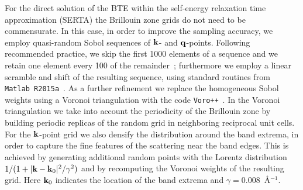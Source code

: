 \documentclass[aps,prl,twocolumn,superscriptaddress]{revtex4-1}
\begin{document}
For the direct solution of the BTE within the self-energy relaxation time approximation (SERTA)
the Brillouin zone grids do not need to be commensurate. In this case, in order to improve the sampling 
accuracy, we employ quasi-random Sobol sequences of ${\bf k}$- and ${\bf q}$-points. Following recommended
practice, we skip the first 1000 elements of a sequence and we retain one element every 100 of the
remainder~\cite{Bratley1988}; furthermore we employ a linear scramble and shift of the resulting
sequence, using standard routines from \texttt{Matlab~R2015a}~\cite{Hong2003}. As a further
refinement we replace the homogeneous Sobol weights using a Voronoi
triangulation with the code \texttt{Voro++}~\cite{Rycroft2009}. In the Voronoi triangulation we take
into account the periodicity of the Brillouin zone by building periodic replicas of the random grid
in neighboring reciprocal unit cells. For the ${\bf k}$-point grid we also densify the distribution
around the band extrema, in order to capture the fine features of the scattering near the band edges.
This is achieved by generating additional random points with the Lorentz distribution
$1/(1+|{\bf k}-{\bf k}_0|^2/\gamma^2)$ and by recomputing the Voronoi weights of the resulting grid. Here ${\bf k}_0$ indicates the location of the band extrema and $\gamma=0.008$~\AA$^{-1}$.
\end{document}
